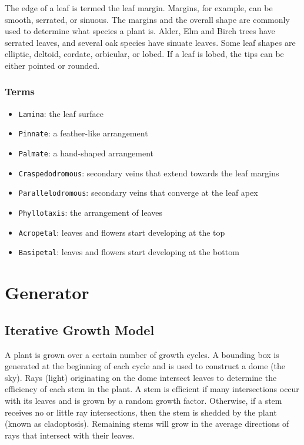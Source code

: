 \documentclass[10pt]{article}
\begin{document}
The edge of a leaf is termed the leaf margin. Margins, for example, can be smooth, serrated, or sinuous. The margins and the overall shape are commonly used to determine what species a plant is. Alder, Elm and Birch trees have serrated leaves, and several oak species have sinuate leaves. Some leaf shapes are elliptic, deltoid, cordate, orbicular, or lobed. If a leaf is lobed, the tips can be either pointed or rounded.

\subsubsection{Terms}
\begin{itemize}
\item \texttt{Lamina}: the leaf surface
\item \texttt{Pinnate}: a feather-like arrangement
\item \texttt{Palmate}: a hand-shaped arrangement
\item \texttt{Craspedodromous}: secondary veins that extend towards the leaf margins
\item \texttt{Parallelodromous}: secondary veins that converge at the leaf apex
\item \texttt{Phyllotaxis}: the arrangement of leaves
\item \texttt{Acropetal}: leaves and flowers start developing at the top
\item \texttt{Basipetal}: leaves and flowers start developing at the bottom
\end{itemize}

\pagebreak
\section{Generator}
\subsection{Iterative Growth Model}
A plant is grown over a certain number of growth cycles. A bounding box is generated at the beginning of each cycle and is used to construct a dome (the sky). Rays (light) originating on the dome intersect leaves to determine the efficiency of each stem in the plant. A stem is efficient if many intersections occur with its leaves and is grown by a random growth factor. Otherwise, if a stem receives no or little ray intersections, then the stem is shedded by the plant (known as cladoptosis). Remaining stems will grow in the average directions of rays that intersect with their leaves.
\end{document}
